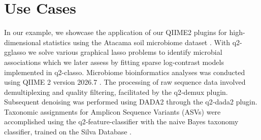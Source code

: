 \documentclass[10pt,a4paper]{article}
\let\cite\citep
\begin{document}




\newpage
\section*{Use Cases} %

In our example, we showcase the application of our QIIME2 plugins for high-dimensional statistics using the Atacama soil microbiome dataset \cite{neilson2017significant}. With q2-gglasso we solve various graphical lasso problems to identify microbial associations which we later assess by fitting sparse log-contrast models implemented in q2-classo. Microbiome bioinformatics analyses was conducted using QIIME 2 version 2026.7 \cite{bolyen2019reproducible}. The processing of raw sequence data involved demultiplexing and quality filtering, facilitated by the q2‐demux plugin. Subsequent denoising was performed using DADA2 \cite{callahan2016dada2} through the q2‐dada2 plugin. Taxonomic assignments for Amplicon Sequence Variants (ASVs) were accomplished using the q2‐feature‐classifier \cite{bokulich2018optimizing} with the naive Bayes taxonomy classifier, trained on the Silva Database \cite{quast2012silva}.
\end{document}
